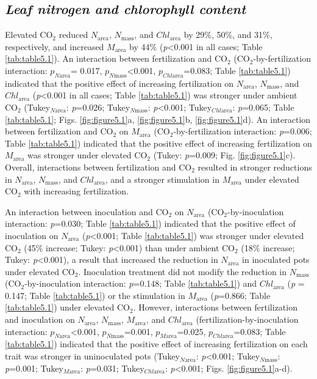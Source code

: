 \subsection{\textit{Leaf nitrogen and chlorophyll content}}
\noindent Elevated CO$_2$ reduced $N_\mathrm{area}$, $N_\mathrm{mass}$, and $Chl_\mathrm{area}$ by 29\%, 50\%, and 31\%, respectively, and increased $M_\mathrm{area}$ by 44\% (\textit{p}<0.001 in all cases; Table \ref{tab:table5.1}). An interaction between fertilization and CO$_2$ (CO$_2$-by-fertilization interaction: $p_{N\mathrm{area}}$= 0.017, $p_{N\mathrm{mass}}$<0.001, $p_{Chl\mathrm{area}}$=0.083; Table \ref{tab:table5.1}) indicated that the positive effect of increasing fertilization on $N_\mathrm{area}$, $N_\mathrm{mass}$, and $Chl_\mathrm{area}$ (\textit{p}<0.001 in all cases; Table \ref{tab:table5.1}) was stronger under ambient CO$_2$ (Tukey$_{N\mathrm{area}}$: \textit{p}=0.026; Tukey$_{N\mathrm{mass}}$: \textit{p}<0.001; Tukey$_{Chl\mathrm{area}}$: \textit{p}=0.065; Table \ref{tab:table5.1}; Figs. \ref{fig:figure5.1}a, \ref{fig:figure5.1}b, \ref{fig:figure5.1}d). An interaction between fertilization and CO$_2$ on $M_\mathrm{area}$ (CO$_2$-by-fertilization interaction: \textit{p}=0.006; Table \ref{tab:table5.1}) indicated that the positive effect of increasing fertilization on $M_\mathrm{area}$ was stronger under elevated CO$_2$ (Tukey: \textit{p}=0.009; Fig. \ref{fig:figure5.1}c). Overall, interactions between fertilization and CO$_2$ resulted in stronger reductions in $N_\mathrm{area}$, $N_\mathrm{mass}$, and $Chl_\mathrm{area}$, and a stronger stimulation in $M_\mathrm{area}$ under elevated CO$_2$ with increasing fertilization. 

An interaction between inoculation and CO$_2$ on $N_\mathrm{area}$ (CO$_2$-by-inoculation interaction: \textit{p}=0.030; Table \ref{tab:table5.1}) indicated that the positive effect of inoculation on $N_\mathrm{area}$ (\textit{p}<0.001; Table \ref{tab:table5.1}) was stronger under elevated CO$_2$ (45\% increase; Tukey: \textit{p}<0.001) than under ambient CO$_2$ (18\% increase; Tukey: \textit{p}<0.001), a result that increased the reduction in $N_\mathrm{area}$ in inoculated pots under elevated CO$_2$. Inoculation treatment did not modify the reduction in $N_\mathrm{mass}$ (CO$_2$-by-inoculation interaction: \textit{p}=0.148; Table \ref{tab:table5.1}) and $Chl_\mathrm{area}$ (\textit{p} = 0.147; Table \ref{tab:table5.1}) or the stimulation in $M_\mathrm{area}$ (\textit{p}=0.866; Table \ref{tab:table5.1}) under elevated CO$_2$. However, interactions between fertilization and inoculation on $N_\mathrm{area}$, $N_\mathrm{mass}$, $M_\mathrm{area}$, and $Chl_\mathrm{area}$ (fertilization-by-inoculation interaction: $p_{N\mathrm{area}}$<0.001, $p_{N\mathrm{mass}}$=0.001, $p_{M\mathrm{area}}$=0.025, $p_{Chl\mathrm{area}}$=0.083; Table \ref{tab:table5.1}) indicated that the positive effect of increasing fertilization on each trait was stronger in uninoculated pots (Tukey$_{N\mathrm{area}}$: \textit{p}<0.001; Tukey$_{N\mathrm{mass}}$: \textit{p}=0.001; Tukey$_{M\mathrm{area}}$: \textit{p}=0.031; Tukey$_{Chl\mathrm{area}}$: \textit{p}<0.001; Figs. \ref{fig:figure5.1}a-d).

